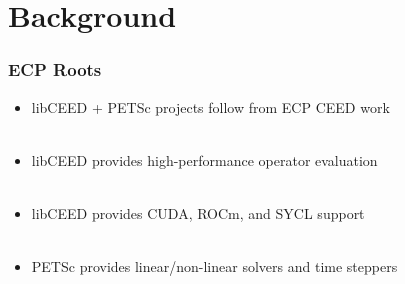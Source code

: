 \documentclass{beamer}
\begin{document}
\section{Background}

\begin{frame}
\begin{center}
\frametitle{ECP Roots}

\begin{itemize}

\item libCEED + PETSc projects follow from ECP CEED work\\

~\\

\item libCEED provides high-performance operator evaluation\\

~\\

\item libCEED provides CUDA, ROCm, and SYCL support\\

~\\

\item PETSc provides linear/non-linear solvers and time steppers\\

\end{itemize}

\end{center}
\end{frame}

\end{document}
